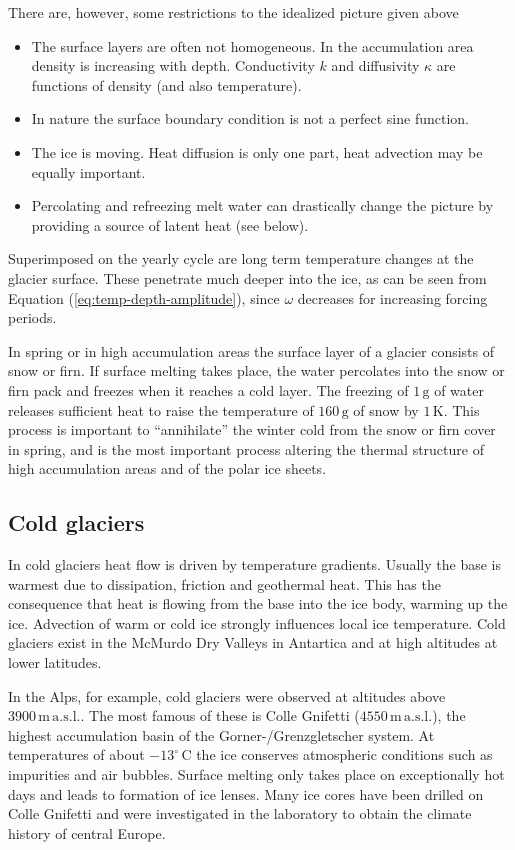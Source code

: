 \documentclass[parskip=half]{scrartcl}
\newcommand{\unit}[1]{\ensuremath{\,\mathrm{#1}}}
\newcommand{\cels}[1]{\ensuremath{#1^{\circ}\,\mathrm{C}}}
\begin{document}
There are, however, some restrictions to the idealized picture given
above
%
\begin{itemize}
\item The surface layers are often not homogeneous.  In the
accumulation area density is increasing with depth. Conductivity $k$
and diffusivity $\kappa$ are functions of density (and also
temperature).
\item In nature the surface boundary condition is not a perfect sine
function.
\item The ice is moving.  Heat diffusion is only one part, heat
advection may be equally important.
\item Percolating and refreezing melt water can drastically change the
picture by providing a source of latent heat (see below).
\end{itemize}
%
Superimposed on the yearly cycle are long term temperature changes at
the glacier surface.  These penetrate much deeper into the ice, as can
be seen from Equation (\ref{eq:temp-depth-amplitude}), since $\omega$
decreases for increasing forcing periods.

In spring or in high accumulation areas the surface layer of a glacier
consists of snow or firn.  If surface melting takes place, the water
percolates into the snow or firn pack and freezes when it reaches a
cold layer.  The freezing of $1\unit{g}$ of water releases sufficient
heat to raise the temperature of $160\unit{g}$ of snow by $1\unit{K}$.
This process is important to ``annihilate'' the winter cold from the
snow or firn cover in spring, and is the most important process
altering the thermal structure of high accumulation areas and of the
polar ice sheets.


\subsection{Cold glaciers}
\label{sec:cold-glaciers}

In cold glaciers heat flow is driven by temperature gradients.
Usually the base is warmest due to dissipation, friction and
geothermal heat.  This has the consequence that heat is flowing from
the base into the ice body, warming up the ice.  Advection of warm or
cold ice strongly influences local ice temperature. Cold glaciers
exist in the McMurdo Dry Valleys in Antartica and at high altitudes at
lower latitudes.

In the Alps, for example, cold glaciers were observed at altitudes
above $3900\unit{m}\unit{a.s.l.}$.  The most famous of these is Colle
Gnifetti ($4550 \unit{m}\unit{a.s.l.}$), the highest accumulation
basin of the Gorner-/Grenzgletscher system.  At temperatures of about
\cels{-13} the ice conserves atmospheric conditions such as impurities
and air bubbles.  Surface melting only takes place on exceptionally
hot days and leads to formation of ice lenses.  Many ice cores have
been drilled on Colle Gnifetti and were investigated in the laboratory
to obtain the climate history of central Europe.
\end{document}
